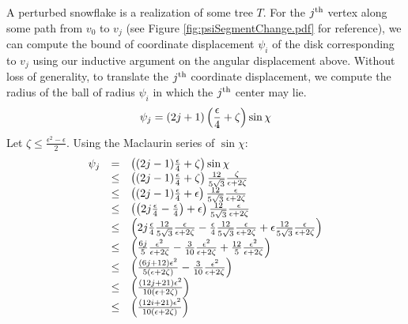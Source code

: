 A perturbed snowflake is a realization of some tree $T$.  
For the $j^\text{th}$ vertex along some path from $v_0$ to $v_j$ (see Figure \ref{fig:psiSegmentChange.pdf} for reference), we can compute the bound of coordinate displacement $\psi_i$ of the disk corresponding to $v_j$ using our inductive argument on the angular displacement above.  
Without loss of generality, to translate the $j^\text{th}$ coordinate displacement, we compute the radius of the ball of radius $\psi_i$ in which the $j^\text{th}$ center may lie. 
$$\psi_j = (2j+1) \left( \frac{\epsilon}{4} + \zeta \right) \sin \chi$$
Let $\zeta \leq \frac{\epsilon^2-\epsilon}{2}$.  
Using the Maclaurin series of $\sin \chi$:
$$
\begin{array}{rcl}
\psi_j &=& \left( (2j-1)  \frac{\epsilon}{4} + \zeta \right) \sin \chi\\
&\leq&\left( (2j-1)  \frac{\epsilon}{4} + \zeta \right) \frac{12}{5 \sqrt{3}}\frac{  \zeta }{ \epsilon + 2\zeta } \\
&\leq&\left( (2j-1)  \frac{\epsilon}{4} + \epsilon \right) \frac{12}{5 \sqrt{3}}\frac{  \epsilon }{ \epsilon + 2\zeta } \\
&\leq&\left( \left( 2j \frac{\epsilon}{4}-\frac{\epsilon}{4} \right) + \epsilon \right) \frac{12}{5 \sqrt{3}}\frac{  \epsilon }{ \epsilon + 2\zeta } \\
&\leq& \left( 2j \frac{\epsilon}{4}  \frac{12}{5 \sqrt{3}}\frac{  \epsilon }{ \epsilon + 2\zeta }-\frac{\epsilon}{4} \frac{12}{5 \sqrt{3}}\frac{  \epsilon }{ \epsilon + 2\zeta }  + \epsilon\frac{12}{5 \sqrt{3}}\frac{  \epsilon }{ \epsilon + 2\zeta }  \right) \\
&\leq& \left(   \frac{6j}{5}\frac{  \epsilon^2 }{ \epsilon + 2\zeta }- \frac{3}{10}\frac{  \epsilon^2 }{ \epsilon + 2\zeta }  + \frac{12}{5} \frac{  \epsilon^2 }{ \epsilon + 2\zeta }  \right) \\
&\leq& \left(   \frac{\left( 6j+12 \right)\epsilon^2}{5\left(  \epsilon + 2\zeta \right)}- \frac{3}{10}\frac{  \epsilon^2 }{ \epsilon + 2\zeta }  \right) \\
&\leq& \left(   \frac{\left( 12j+21 \right)\epsilon^2}{10\left(  \epsilon + 2\zeta \right)}  \right) \\
&\leq& \left(   \frac{\left( 12i+21 \right)\epsilon^2}{10\left(  \epsilon + 2\zeta \right)}  \right) \\
\end{array}
$$
